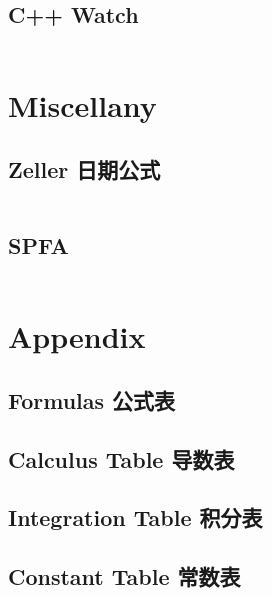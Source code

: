 \documentclass[titlepage, a4paper, 9pt]{article}
\begin{document}
\begin{multicols}{2}
\begin{spacing}{0.6}
                \subsection{C++ Watch}
                \inputminted{cpp}{src/Language/Watch.cpp}
			
			\section{Miscellany}
				\subsection{Zeller 日期公式}
				\inputminted{cpp}{src/Miscellany/Zeller 日期公式.cpp}
				\subsection{SPFA}
				\inputminted{cpp}{src/Miscellany/SPFA.cpp}
			
			\section{Appendix}
				\begin{spacing}{0.5}
				\subsection{Formulas 公式表}
				
				\subsection{Calculus Table 导数表}
				
				\subsection{Integration Table 积分表}
				
				\subsection{Constant Table 常数表}
				
				\end{spacing}

		\end{spacing}
		\endgroup
	\end{multicols}
	
\end{document}
